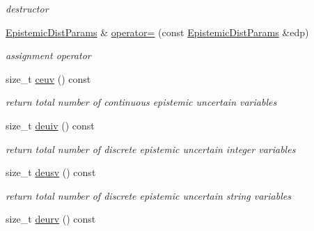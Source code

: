 \begin{DoxyCompactItemize}
\begin{DoxyCompactList}\small\item\em destructor \end{DoxyCompactList}\item 
\hyperlink{classPecos_1_1EpistemicDistParams}{Epistemic\+Dist\+Params} \& \hyperlink{classPecos_1_1EpistemicDistParams_a27a62dcc32abd4faea77c62e9f0e7e73}{operator=} (const \hyperlink{classPecos_1_1EpistemicDistParams}{Epistemic\+Dist\+Params} \&edp)\label{classPecos_1_1EpistemicDistParams_a27a62dcc32abd4faea77c62e9f0e7e73}

\begin{DoxyCompactList}\small\item\em assignment operator \end{DoxyCompactList}\item 
size\+\_\+t \hyperlink{classPecos_1_1EpistemicDistParams_a4c50fa5198ce132eb8339e1736012949}{ceuv} () const \label{classPecos_1_1EpistemicDistParams_a4c50fa5198ce132eb8339e1736012949}

\begin{DoxyCompactList}\small\item\em return total number of continuous epistemic uncertain variables \end{DoxyCompactList}\item 
size\+\_\+t \hyperlink{classPecos_1_1EpistemicDistParams_a8368a575e55d7fc0380aa9771c1201bc}{deuiv} () const \label{classPecos_1_1EpistemicDistParams_a8368a575e55d7fc0380aa9771c1201bc}

\begin{DoxyCompactList}\small\item\em return total number of discrete epistemic uncertain integer variables \end{DoxyCompactList}\item 
size\+\_\+t \hyperlink{classPecos_1_1EpistemicDistParams_a8b1da44c48aeed96bc9b5e3d1dbb772c}{deusv} () const \label{classPecos_1_1EpistemicDistParams_a8b1da44c48aeed96bc9b5e3d1dbb772c}

\begin{DoxyCompactList}\small\item\em return total number of discrete epistemic uncertain string variables \end{DoxyCompactList}\item 
size\+\_\+t \hyperlink{classPecos_1_1EpistemicDistParams_a4c63a27e1f93b03574f04b4c8ae57bf1}{deurv} () const \label{classPecos_1_1EpistemicDistParams_a4c63a27e1f93b03574f04b4c8ae57bf1}


\end{DoxyCompactItemize}
